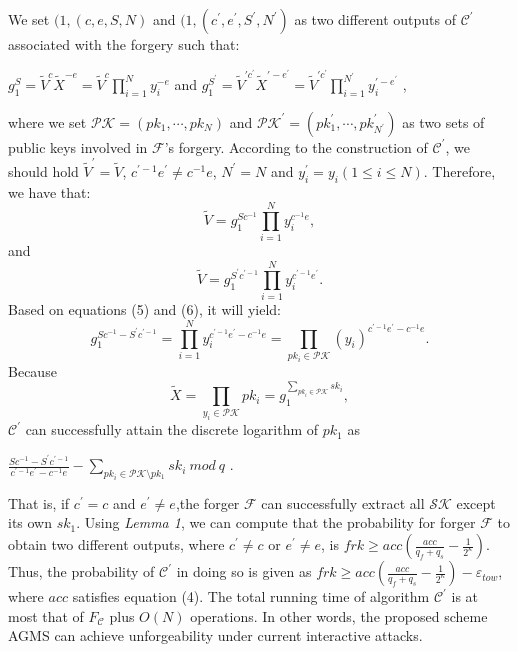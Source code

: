 \documentclass[journal]{IEEEtran}
\begin{document}
We set \((1,(c,e,S,N)\) and \((1,(c^\prime,e^\prime,S^\prime,N^\prime)\) as two different outputs of \(\mathcal{C}^\prime\) associated with the forgery such that:
\begin{center}
\(g_1^S=\tilde{V}^c\tilde{X}^{-e}=\tilde{V}^c\prod_{i=1}^N y_i^{-e}\) and \(g_1^{S^\prime}=\tilde{V}^{\prime c^\prime}\tilde{X}^{\prime -e^\prime}=\tilde{V}^{\prime c^\prime}\prod_{i=1}^{N^\prime} y_i^{\prime -e^\prime}\) ,
\end{center}
where we set \(\mathcal{PK}={(pk_1,\cdots,pk_N)}\) and \(\mathcal{PK}^\prime={(pk_1^\prime,\cdots,pk_{N^\prime}^\prime)}\) as two sets of public keys involved in \(\mathcal{F}\)'s forgery. According to the construction of \(\mathcal{C}^\prime\), we should hold \(\tilde{V}^\prime=\tilde{V}\), \(c^{\prime -1}e^{\prime}\neq c^{-1}e\), \(N^\prime=N\) and \(y_i^\prime=y_i(1\leq i \leq N)\). Therefore, we have that:
\begin{equation}
\tilde{V}=g_1^{Sc^{-1}}\prod_{i=1}^{N} y_i^{c^{-1}e},
\end{equation}
and
\begin{equation}
\tilde{V}=g_1^{S^\prime c^{\prime-1}}\prod_{i=1}^{N} y_i^{c^{\prime-1} e^\prime}.
\end{equation}
Based on equations (5) and (6), it will yield:
\begin{equation}
g_1^{Sc^{-1}-S^\prime c^{\prime -1}}=\prod_{i=1}^N y_i^{c^{\prime -1}e^\prime -c^{-1}e}=\prod_{pk_i\in \mathcal{PK}}(y_i)^{c^{\prime -1}e^\prime -c^{-1}e }.
\end{equation}
Because
 \begin{equation}
 \tilde{X}=\prod_{y_i\in \mathcal{PK}} pk_i=g_1^{\sum_{pk_i\in \mathcal{PK}}sk_i},
 \end{equation}
\(\mathcal{C}^\prime\) can successfully attain the discrete logarithm of \(pk_1\) as
\begin{center}
\(\frac{Sc^{-1}-S^\prime c^{\prime -1}}{c^{\prime -1}e^\prime  -c^{-1}e}-\sum_{pk_i\in \mathcal{PK} \setminus pk_1}sk_i\ mod\ q\) .
\end{center}
That is, if $c^\prime=c$ and $e^\prime\neq e$,the forger $\mathcal{F}$ can successfully extract all $\mathcal{SK}$ except its own $sk_1$. Using \noindent\emph{Lemma 1}, we can compute that the probability for forger \(\mathcal{F}\) to obtain two different outputs, where \(c^\prime\neq c\) or \(e^\prime\neq e\), is \(frk \geq acc(\frac{acc}{q_f+q_s}-\frac{1}{2^{\kappa}})\). Thus,
the probability of \(\mathcal{C}^\prime\) in doing so is given as \( frk \geq acc(\frac{acc}{q_f+q_s}-\frac{1}{2^{\kappa}})-\varepsilon_{tow}\), where \(acc\) satisfies equation (4). The total running time of algorithm \(\mathcal{C}^\prime\) is at most that of \(F_\mathcal{C}\) plus \(O(N)\) operations.
In other words, the proposed scheme AGMS can achieve unforgeability under current interactive attacks.
\end{document}
